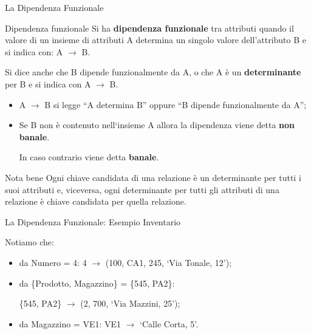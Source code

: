 \begin{frame}{La Dipendenza Funzionale}
\begin{minipage}{0.9\textwidth}
\begin{block}{Dipendenza funzionale}
    Si ha \textbf{dipendenza funzionale} tra attributi quando il valore di un insieme di attributi A determina un singolo valore dell'attributo B e si indica con: A $ \rightarrow $ B.

    Si dice anche che B dipende funzionalmente da A, o che A \`e un \textbf{determinante} per B e si indica con A $ \rightarrow $ B.
\end{block}
\end{minipage}
\pause
\begin{itemize}[<+->]
    \item A $ \rightarrow $ B si legge ``A determina B'' oppure ``B dipende funzionalmente da A'';
    \item Se B non \`e contenuto nell`insieme A allora la dipendenza viene detta \textbf{non banale}.
    
    In caso contrario viene detta \textbf{banale}.
\end{itemize}
\pause
\begin{block}{Nota bene}
    Ogni chiave candidata di una relazione \`e un determinante per tutti i suoi attributi e, viceversa, ogni determinante per tutti gli attributi di una relazione \`e chiave candidata per quella relazione.
\end{block}
\end{frame}
%
\begin{frame}{La Dipendenza Funzionale: Esempio Inventario}
\vspace{-0.7cm}
\InventarioModified

Notiamo che:
\begin{itemize}[<+->]
    \item da Numero = 4: 4 $ \rightarrow $ (100, CA1, 245, `Via Tonale, 12');
    \item da \{Prodotto, Magazzino\} = \{545, PA2\}:
    
    \{545, PA2\} $ \rightarrow $ (2, 700, `Via Mazzini, 25');
    \item da Magazzino = VE1: VE1 $ \rightarrow $ `Calle Corta, 5'.
\end{itemize}
\end{frame}
